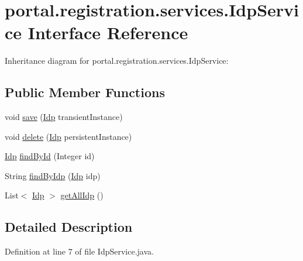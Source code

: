 \hypertarget{interfaceportal_1_1registration_1_1services_1_1IdpService}{
\section{portal.registration.services.IdpService Interface Reference}
\label{interfaceportal_1_1registration_1_1services_1_1IdpService}
}


Inheritance diagram for portal.registration.services.IdpService:
\subsection*{Public Member Functions}
\begin{DoxyCompactItemize}
\item 
void \hyperlink{interfaceportal_1_1registration_1_1services_1_1IdpService_a9580d378bcabcb2937fe25d864cebfad}{save} (\hyperlink{classportal_1_1registration_1_1domain_1_1Idp}{Idp} transientInstance)
\item 
void \hyperlink{interfaceportal_1_1registration_1_1services_1_1IdpService_acae983320a6d563924da831b37688d3e}{delete} (\hyperlink{classportal_1_1registration_1_1domain_1_1Idp}{Idp} persistentInstance)
\item 
\hyperlink{classportal_1_1registration_1_1domain_1_1Idp}{Idp} \hyperlink{interfaceportal_1_1registration_1_1services_1_1IdpService_a86683b14e9bb0cbedc41bf0aea7f6b66}{findById} (Integer id)
\item 
String \hyperlink{interfaceportal_1_1registration_1_1services_1_1IdpService_ab0052670b9f95e31d046e7bf43c432b8}{findByIdp} (\hyperlink{classportal_1_1registration_1_1domain_1_1Idp}{Idp} idp)
\item 
List$<$ \hyperlink{classportal_1_1registration_1_1domain_1_1Idp}{Idp} $>$ \hyperlink{interfaceportal_1_1registration_1_1services_1_1IdpService_a960ddec4986911fa1588e72c9cc10c0f}{getAllIdp} ()
\end{DoxyCompactItemize}


\subsection{Detailed Description}


Definition at line 7 of file IdpService.java.



